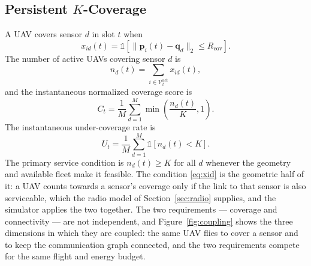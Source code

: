 \documentclass[conference]{IEEEtran}
\begin{document}
\subsection{Persistent \texorpdfstring{$K$}{K}-Coverage}
\label{sec:coverage}
A UAV covers sensor $d$ in slot $t$ when
\begin{equation}
x_{id}(t)=\mathbb 1\!\left[\|\mathbf p_i(t)-\mathbf q_d\|_2\le R_{\mathrm{cov}}\right].
\label{eq:xid}
\end{equation}
The number of active UAVs covering sensor $d$ is
\begin{equation}
n_d(t)=\sum_{i\in\mathcal V_t^{\mathrm{act}}}x_{id}(t),
\label{eq:nd}
\end{equation}
and the instantaneous normalized coverage score is
\begin{equation}
C_t=\frac{1}{M}\sum_{d=1}^{M}\min\left(\frac{n_d(t)}{K},1\right).
\label{eq:Ct}
\end{equation}
The instantaneous under-coverage rate is
\begin{equation}
U_t=\frac{1}{M}\sum_{d=1}^{M}\mathbb 1[n_d(t)<K].
\label{eq:Ut}
\end{equation}
The primary service condition is $n_d(t)\ge K$ for all $d$ whenever the geometry and available fleet make it feasible. The condition \eqref{eq:xid} is the geometric half of it: a UAV counts towards a sensor's coverage only if the link to that sensor is also serviceable, which the radio model of Section~\ref{sec:radio} supplies, and the simulator applies the two together. The two requirements --- coverage and connectivity --- are not independent, and Figure~\ref{fig:coupling} shows the three dimensions in which they are coupled: the same UAV flies to cover a sensor and to keep the communication graph connected, and the two requirements compete for the same flight and energy budget.
\end{document}
